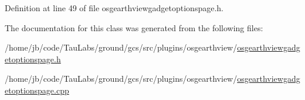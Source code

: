 \-Definition at line 49 of file osgearthviewgadgetoptionspage.\-h.



\-The documentation for this class was generated from the following files\-:\begin{DoxyCompactItemize}
\item 
/home/jb/code/\-Tau\-Labs/ground/gcs/src/plugins/osgearthview/\hyperlink{osgearthviewgadgetoptionspage_8h}{osgearthviewgadgetoptionspage.\-h}\item 
/home/jb/code/\-Tau\-Labs/ground/gcs/src/plugins/osgearthview/\hyperlink{osgearthviewgadgetoptionspage_8cpp}{osgearthviewgadgetoptionspage.\-cpp}\end{DoxyCompactItemize}
